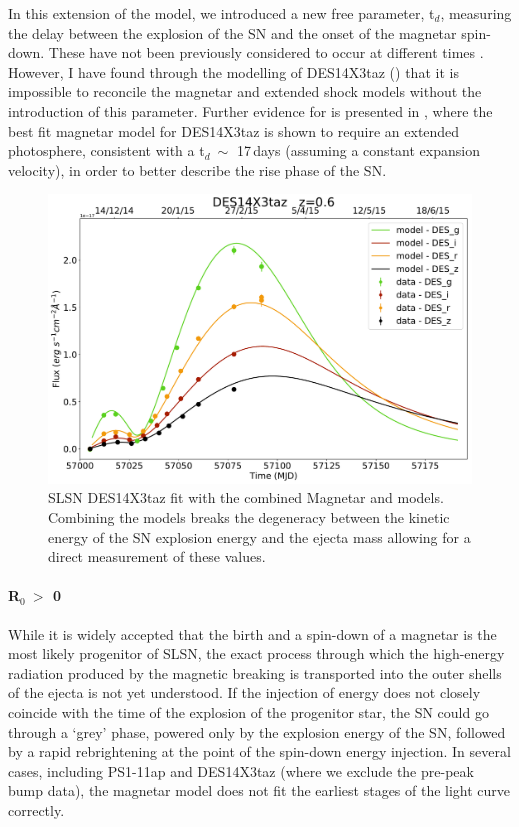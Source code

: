 In this extension of the model, we introduced a new free parameter, t$_d$, measuring the delay between the explosion of the SN and the onset of the magnetar spin-down. These have not been previously considered to occur at different times \citep{Nicholl2015b}. However, I have found through the modelling of DES14X3taz () that it is impossible to reconcile the magnetar and extended shock models without the introduction of this parameter. Further evidence for is presented in , where the best fit magnetar model for DES14X3taz is shown to require an extended photosphere, consistent with a t$_d ~\sim$ 17\,days (assuming a constant expansion velocity), in order to better describe the rise phase of the SN.

\begin{figure}
  \centering
  \includegraphics[width=\textwidth]{Figures/Chapter3/DES14X3taz}
  \caption{SLSN DES14X3taz fit with the combined Magnetar and \citet{Piro2015} models. Combining the models breaks the degeneracy between the kinetic energy of the SN explosion energy and the ejecta mass allowing for a direct measurement of these values.}
  \label{fig:PiroMagnetar}
\end{figure}

\paragraph{R$_0~>$ 0}
\label{par:R0nonzero}
While it is widely accepted that the birth and a spin-down of a magnetar is the most likely progenitor of SLSN, the exact process through which the high-energy radiation produced by the magnetic breaking is transported into the outer shells of the ejecta is not yet understood. If the injection of energy does not closely coincide with the time of the explosion of the progenitor star, the SN could go through a `grey' phase, powered only by the explosion energy of the SN, followed by a rapid rebrightening at the point of the spin-down energy injection. In several cases, including PS1-11ap and DES14X3taz (where we exclude the pre-peak bump data), the magnetar model does not fit the earliest stages of the light curve correctly.

